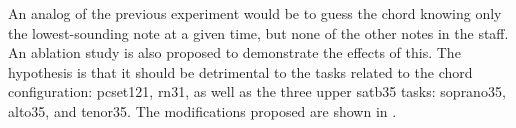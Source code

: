 
An analog of the previous experiment would be to guess the
chord knowing only the lowest-sounding note at a given time,
but none of the other notes in the staff. An ablation study
is also proposed to demonstrate the effects of this. The
hypothesis is that it should be detrimental to the tasks
related to the chord configuration: \gls{pcset121},
\gls{rn31}, as well as the three upper \gls{satb35} tasks:
\gls{soprano35}, \gls{alto35}, and \gls{tenor35}. The
modifications proposed are shown in .


